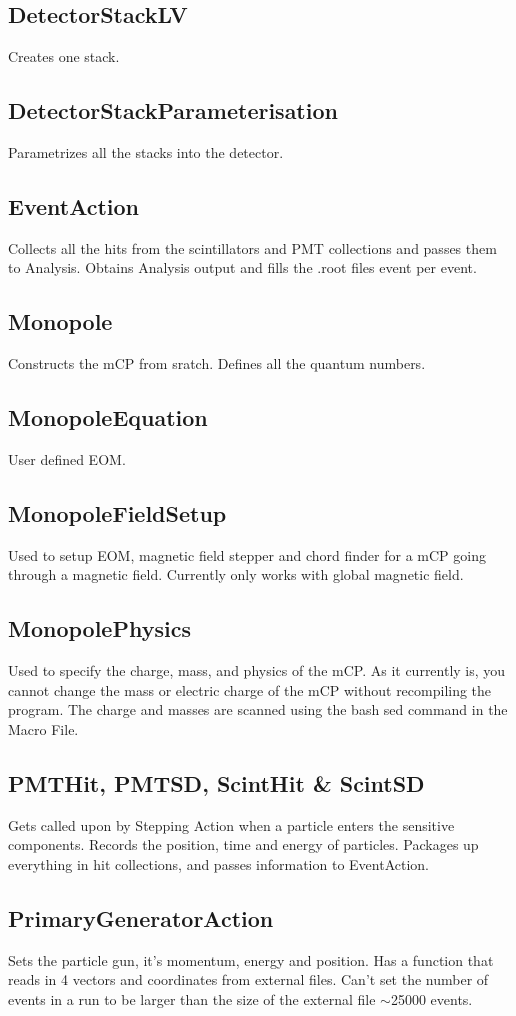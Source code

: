 \documentclass[prd,noshowpacs,nofootinbib,amsmath,amssymb,superscriptaddress]{revtex4}
\begin{document}
\subsection{DetectorStackLV}
Creates one stack.
\subsection{DetectorStackParameterisation}
Parametrizes all the stacks into the detector.
\subsection{EventAction}
Collects all the hits from the scintillators and PMT collections and passes them to Analysis. Obtains Analysis output and fills the 
.root files event per event.
\subsection{Monopole}
Constructs the mCP from sratch. Defines all the quantum numbers.
\subsection{MonopoleEquation}
User defined EOM.
\subsection{MonopoleFieldSetup}
Used to setup EOM, magnetic field stepper and chord finder for a mCP going through a magnetic field. 
Currently only works with global magnetic field.
\subsection{MonopolePhysics}
Used to specify the charge, mass, and physics of the mCP. As it currently is, you cannot change the mass or electric charge of the mCP without recompiling the program.  
The charge and masses are scanned using the bash sed command in the Macro File.
\subsection{PMTHit, PMTSD, ScintHit \& ScintSD}
Gets called upon by Stepping Action when a particle enters the sensitive components. Records the position, time and energy of particles.
Packages up everything in hit collections, and passes information to EventAction.
\subsection{PrimaryGeneratorAction}
Sets the particle gun, it's momentum, energy and position. Has a function that reads in 4 vectors and coordinates from external files.
Can't set the number of events in a run to be larger than the size of the external file $\sim$25000 events.
\end{document}
